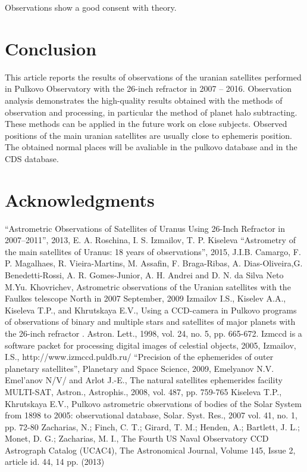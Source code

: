 \documentclass[]{article}
\begin{document}
Observations show a good consent with theory.\par

\section{Conclusion}
This article reports the results of observations of the uranian satellites performed in Pulkovo Observatory with the 26-inch refractor in 2007 -- 2016. Observation analysis demonstrates the high-quality results obtained with the methods of observation and processing, in particular the method of planet halo subtracting. These methods can be applied in the future work on close subjects. Observed positions of the main uranian satellites are usually close to ephemeris position. The obtained normal places will be avaliable in the pulkovo database and in the CDS database.

\section{Acknowledgments}





\begin{thebibliography}{99}
 \textquotedblleft Astrometric Observations of Satellites of Uranus Using 26-Inch Refractor in 2007--2011\textquotedblright, 2013, E. A. Roschina, I. S. Izmailov, T. P. Kiseleva
  \textquotedblleft Astrometry of the main satellites of Uranus: 18 years of observations\textquotedblright, 2015, J.I.B. Camargo, F. P. Magalhaes, R. Vieira-Martins, M. Assafin, F. Braga-Ribas, A. Dias-Oliveira,G. Benedetti-Rossi, A. R. Gomes-Junior, A. H. Andrei and D. N. da Silva Neto
 M.Yu. Khovrichev, Astrometric observations of the Uranian satellites with the Faulkes telescope North in 2007 September, 2009
 Izmailov I.S., Kiselev A.A., Kiseleva T.P., and Khrutskaya E.V., Using a CCD-camera in Pulkovo programs of observations of binary and multiple stars and satellites of major planets with the 26-inch refractor . Astron. Lett., 1998, vol. 24, no. 5, pp. 665-672.
  Izmccd is a software  packet for processing digital images of celestial objects, 2005, Izmailov, I.S., http://www.izmccd.puldb.ru/
 \textquotedblleft Precision of the ephemerides of outer planetary satellites\textquotedblright, Planetary and Space Science, 2009, Emelyanov N.V.
 Emel'anov N/V/ and Arlot J.-E., The natural satellites ephemerides facility MULTI-SAT, Astron., Astrophis., 2008, vol. 487, pp. 759-765
 Kiseleva T.P., Khrutskaya E.V., Pulkovo astrometric observations of bodies of the Solar System from 1898 to 2005: observational database, Solar. Syst. Res., 2007 vol. 41, no. 1, pp. 72-80
 Zacharias, N.; Finch, C. T.; Girard, T. M.; Henden, A.; Bartlett, J. L.; Monet, D. G.; Zacharias, M. I., The Fourth US Naval Observatory CCD Astrograph Catalog (UCAC4), The Astronomical Journal, Volume 145, Issue 2, article id. 44, 14 pp. (2013)
\end{thebibliography}
\end{document}
